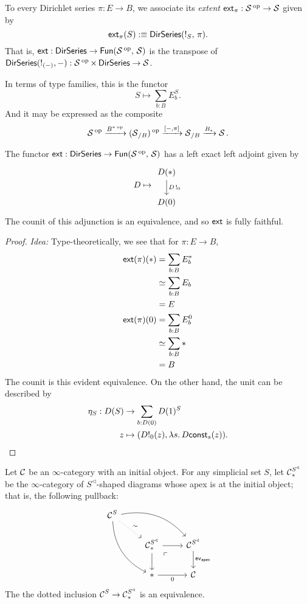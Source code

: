 \begin{defn}
To every Dirichlet series $\pi : E \to B$, we associate its \emph{extent}
$\mathsf{{ext}}_{\pi} : \operatorname{\mathcal{S}}\operatorname{^\text{op}} \to \operatorname{\mathcal{S}}$ given by
$$\mathsf{{ext}}_{\pi}(S) :\equiv \operatorname{\mathsf{{DirSeries}}}(\operatorname{!}_S,\, \pi).$$
That is, $\mathsf{{ext}} : \operatorname{\mathsf{{DirSeries}}} \to \operatorname{\mathsf{{Fun}}}(\operatorname{\mathcal{S}}\operatorname{^\text{op}},\, \operatorname{\mathcal{S}})$ is the transpose of
$\operatorname{\mathsf{{DirSeries}}}(\operatorname{!}_{(-)}, -) : \operatorname{\mathcal{S}}\operatorname{^\text{op}} \times \operatorname{\mathsf{{DirSeries}}} \to \operatorname{\mathcal{S}}$.

In terms of type families, this is the functor
$$S \mapsto \sum_{b : B} E_b^S.$$
And it may be expressed as the composite
$$\operatorname{\mathcal{S}}\operatorname{^\text{op}} \xrightarrow{B^{\ast}\operatorname{^\text{op}}} (\operatorname{\mathcal{S}}_{/B})\operatorname{^\text{op}} \xrightarrow{[-,\pi]} \operatorname{\mathcal{S}}_{/B} \xrightarrow{B_{\ast}}
\operatorname{\mathcal{S}}.$$
\end{defn}




\begin{prop}
The functor $\mathsf{{ext}} : \operatorname{\mathsf{{DirSeries}}} \to \operatorname{\mathsf{{Fun}}}(\operatorname{\mathcal{S}}\operatorname{^\text{op}},\, \operatorname{\mathcal{S}})$ has a left exact
left adjoint given by
$$D \mapsto \begin{tikzcd} D(\ast) \arrow[d, "D\bang_0"] \\ D(0) \end{tikzcd}$$
The counit of this adjunction is an equivalence, and so $\mathsf{{ext}}$ is fully faithful.
\end{prop}
\begin{proof}
\emph{Idea:} Type-theoretically, we see that for $\pi : E \to B$,
\begin{align*}
  \mathsf{{ext}}(\pi)(\ast) &= \sum_{b : B}E_b^\ast\\
  &\simeq \sum_{b : B} E_b\\
  &= E\\
  \mathsf{{ext}}(\pi)(0) &= \sum_{b : B}E_b^0\\
  &\simeq \sum_{b : B} \ast\\
    &= B
\end{align*}
The counit is this evident equivalence. On the other hand, the unit can be
described by
\begin{align*}
  \eta_S : D(S) &\to \sum_{b : D(0)} D(1)^S\\
  z &\mapsto (D!_0(z), \lambda {s}.\, D\mathsf{{const}}_s(z)).
\end{align*}
\end{proof}

\begin{lem}\label{lem:cone.initial.equivalence}
Let $\operatorname{\mathcal{C}}$ be an $\infty$-category with an initial object. For any simplicial set
$S$, let $\operatorname{\mathcal{C}}^{S^{\triangleleft}}_{\ast}$ be the $\infty$-category of
  $S^{\triangleleft}$-shaped diagrams whose apex is at the initial object; that
  is, the following pullback:
  \[
    \begin{tikzcd}
      \Ca^{S} \arrow[drr, bend left] \arrow[ddr, bend right] \arrow[dr,
      dotted, "\sim"] & & \\
      & \Ca^{S^{\triangleleft}}_{\ast} \arrow[d] \arrow[r] \arrow[dr, phantom,
      "\ulcorner" very near start] & \Ca^{S^{\triangleleft}} \arrow[d,
      "\term{ev}_{\term{apex}}"] \\
      & \ast \arrow[r, "0"'] & \Ca
    \end{tikzcd}
  \]
The the dotted inclusion $\operatorname{\mathcal{C}}^{S} \to \operatorname{\mathcal{C}}^{S^{\triangleleft}}_{\ast}$ is an equivalence.
\end{lem}

